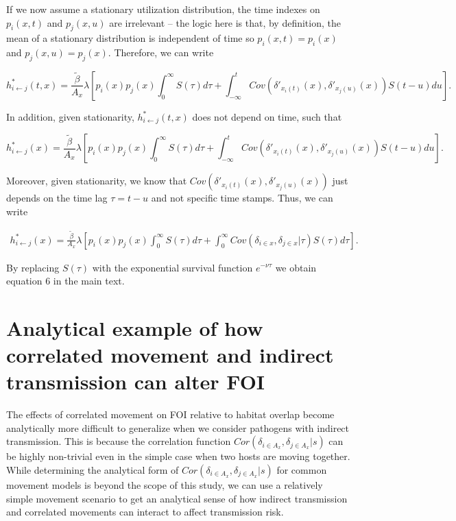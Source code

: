 \documentclass[letterpaper]{article}
\begin{document}
If we now assume a stationary utilization distribution, the time indexes on $p_i(x, t)$ and $p_j(x, u)$ are irrelevant -- the logic here is that, by definition, the mean of a stationary distribution is independent of time so $p_i(x, t) = p_i(x)$ and $p_j(x, u) = p_j(x)$. Therefore, we can write  

$$
h^*_{i \leftarrow j}(t, x) = \frac{\tilde{\beta}}{A_x} \lambda \left[p_i(x) p_j(x) \int_0^\infty S(\tau) d\tau  + \int_{-\infty}^t Cov(\delta'_{x_i(t)}(x), \delta'_{x_j(u)}(x)) S(t - u) du\right].
$$

In addition, given stationarity, $h^*_{i \leftarrow j}(t, x)$ does not depend on time, such that 

$$
h^*_{i \leftarrow j}(x) = \frac{\tilde{\beta}}{A_x} \lambda \left[p_i(x) p_j(x) \int_0^\infty S(\tau) d\tau  + \int_{-\infty}^t Cov(\delta'_{x_i(t)}(x), \delta'_{x_j(u)}(x)) S(t - u) du\right].
$$

Moreover, given stationarity, we know that $Cov(\delta'_{x_i(t)}(x), \delta'_{x_j(u)}(x))$ just depends on the time lag $\tau = t - u$ and not specific time stamps. Thus, we can write

\begin{equation}
    \begin{aligned}
   h^*_{i \leftarrow j}(x) = \frac{\tilde{\beta}}{A_x} \lambda \left[p_i(x)p_j(x) \int_0^\infty S(\tau) d\tau + \int_{0}^{\infty} Cov(\delta_{i \in x}, \delta_{j \in x} | \tau) S(\tau) d\tau\right].
    \end{aligned}
    \label{eq:foi_stationary}
\end{equation}

By replacing $S(\tau)$ with the exponential survival function $e^{-\nu \tau}$ we obtain equation 6 in the main text.

\section*{Analytical example of how correlated movement and indirect transmission can alter FOI}

The effects of correlated movement on FOI relative to habitat overlap become analytically more difficult to generalize when we consider pathogens with indirect transmission.  This is because the correlation function $Cor(\delta_{i \in A_x}, \delta_{j \in A_x} | s)$ can be highly non-trivial even in the simple case when two hosts are moving together.  
While determining the analytical form of $Cor(\delta_{i \in A_x}, \delta_{j \in A_x} | s)$ for common movement models is beyond the scope of this study, we can use a relatively simple movement scenario to get an analytical sense of how indirect transmission and correlated movements can interact to affect transmission risk.
\end{document}
